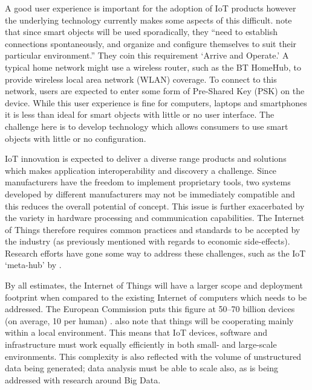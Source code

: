         A good user experience is important for the adoption of IoT products however the underlying technology currently makes some aspects of this difficult. \citet{fromIoC} note that since smart objects will be used sporadically, they ``need to establish connections spontaneously, and organize and configure themselves to suit their particular environment.'' They coin this requirement `Arrive and Operate.' A typical home network might use a wireless router, such as the BT HomeHub, to provide wireless local area network (WLAN) coverage. To connect to this network, users are expected to enter some form of Pre-Shared Key (PSK) on the device. While this user experience is fine for computers, laptops and smartphones it is less than ideal for smart objects with little or no user interface. The challenge here is to develop technology which allows consumers to use smart objects with little or no configuration.

        IoT innovation is expected to deliver a diverse range products and solutions which makes application interoperability and discovery a challenge. Since manufacturers have the freedom to implement proprietary tools, two systems developed by different manufacturers may not be immediately compatible and this reduces the overall potential of concept. This issue is further exacerbated by the variety in hardware processing and communication capabilities. The Internet of Things therefore requires common practices and standards to be accepted by the industry (as previously mentioned with regards to economic side-effects). Research efforts have gone some way to address these challenges, such as the IoT `meta-hub' by \citet{interoperability:2015}.

        By all estimates, the Internet of Things will have a larger scope and deployment footprint when compared to the existing Internet of computers which needs to be addressed. The European Commission puts this figure at 50--70 billion devices (on average, 10 per human) . \citet{fromIoC} also note that things will be cooperating mainly within a local environment. This means that IoT devices, software and infrastructure must work equally efficiently in both small- and large-scale environments. This complexity is also reflected with the volume of unstructured data being generated; data analysis must be able to scale also, as is being addressed with research around Big Data.

